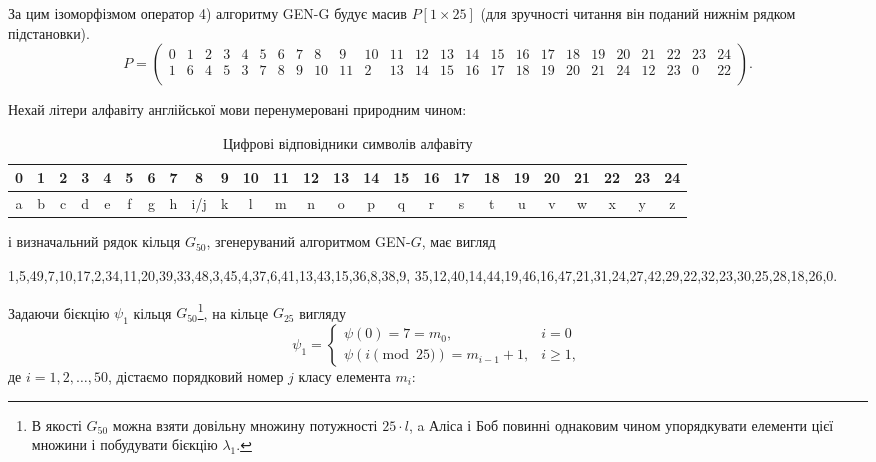 \documentclass{ceurart}
\begin{document}
{За цим ізоморфізмом оператор 4) алгоритму GEN-G будує масив
\(P[1\times 25]\) (для зручності читання він поданий нижнім рядком
підстановки).
\[ %
P=\begin{pmatrix}
0 & 1 & 2 & 3 & 4 & 5 & 6 & 7 & 8 & 9 & 10 & 11 & 12 & 13 & 14  &
15 & 16 & 17 & 18 & 19 & 20 & 21 & 22 & 23 &  24\\
1&6&4&5&3&7&8&9&10&11&2&13&14&15&16&17&18&19&20&21&24&12&23&0&22\\
\end{pmatrix}.
\]

Нехай літери алфавіту англійської мови перенумеровані природним чином:
\begin{table}[ht] %
 \centering
 \caption{Цифрові відповідники символів алфавіту} %
 \label{tab:alphabet}
 \vspace{0.1cm} %
 \begin{tabular}{ %
 |c@{}|c@{}|c@{}|c@{}|c@{}|c@{}|c@{}|c@{}|c@{}|c@{}|
 c@{}|c@{}|c@{}|c@{}|c@{}|c@{}|c@{}|c@{}|c@{}|c@{}|c@{}|c@{}|c@{}|c@{}|c@{}|}
 \hline
 0 & 1 & 2 & 3 & 4 & 5 & 6 & 7 & 8 & 9 & 10 & 11 & 12 & 13 & 14  &
 15 & 16 & 17 & 18 & 19 & 20 & 21 & 22 & 23 &  24\\
 \hline
 a & b & c & d & e & f & g & h & i/j & k & l & m & n & o & p & q &
 r & s & t & u & v & w & x & y & z\\
 \hline
 \end{tabular}
\end{table}
і визначальний рядок кільця \(G_{50}\), згенеруваний алгоритмом GEN-\(G\),
має вигляд
\begin{center} %
1,5,49,7,10,17,2,34,11,20,39,33,48,3,45,4,37,6,41,13,43,15,36,8,38,9,
35,12,40,14,44,19,46,16,47,21,31,24,27,42,29,22,32,23,30,25,28,18,26,0.
\end{center}

Задаючи бієкцію \(\psi_1\) кільця \(G_{50}\)\footnote{В якості \(G_{50}\) можна
взяти довільну множину потужності \(25\cdot l\), a Аліса і Боб повинні однаковим
чином упорядкувати елементи цієї множини і побудувати бієкцію \(\lambda_1\).},
на кільце \(G_{25}\) вигляду
\[
\psi_1= \begin{cases}
\psi(0) = 7=m_0, & i=0 \\
\psi(i \pmod{25}) = m_{i-1} +1, & i \geq 1,
\end{cases}
\]
де \(i=1,2,\ldots,50\), дістаємо порядковий номер \(j\) класу елемента \(m_i\):\\

}
\end{document}
